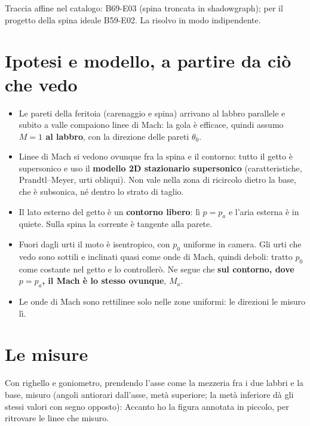 
Traccia affine nel catalogo: B69-E03 (spina troncata in shadowgraph); per il progetto della spina ideale B59-E02. La
risolvo in modo indipendente.

\section*{Ipotesi e modello, a partire da ciò che vedo}
\begin{itemize}
\item Le pareti della feritoia (carenaggio e spina) arrivano al labbro parallele e subito a valle compaiono linee di
  Mach: la gola è efficace, quindi assumo \textbf{$M=1$ al labbro}, con la direzione delle pareti $\theta_0$.
\item Linee di Mach si vedono ovunque fra la spina e il contorno: tutto il getto è supersonico e uso il
  \textbf{modello 2D stazionario supersonico} (caratteristiche, Prandtl--Meyer, urti obliqui). Non vale nella zona di
  ricircolo dietro la base, che è subsonica, né dentro lo strato di taglio.
\item Il lato esterno del getto è un \textbf{contorno libero}: lì $p=p_a$ e l'aria esterna è in quiete. Sulla spina la
  corrente è tangente alla parete.
\item Fuori dagli urti il moto è isentropico, con $p_0$ uniforme in camera. Gli urti che vedo sono sottili e inclinati
  quasi come onde di Mach, quindi deboli: tratto $p_0$ come costante nel getto e lo controllerò. Ne segue che
  \textbf{sul contorno, dove $p=p_a$, il Mach è lo stesso ovunque}, $M_a$.
\item Le onde di Mach sono rettilinee solo nelle zone uniformi: le direzioni le misuro lì.
\end{itemize}

\section*{Le misure}
Con righello e goniometro, prendendo l'asse come la mezzeria fra i due labbri e la base, misuro (angoli antiorari
dall'asse, metà superiore; la metà inferiore dà gli stessi valori con segno opposto):
Accanto ho la figura annotata in piccolo, per ritrovare le linee che misuro.

